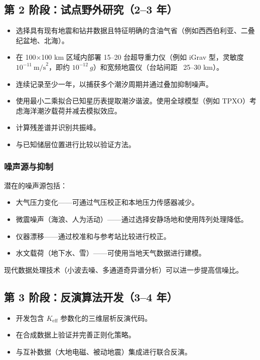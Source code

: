 \documentclass[12pt,a4paper]{article}
\theoremstyle{remark}
\newcommand{\Keff}{K_{\mathrm{eff}}}
\begin{document}
	\subsection{第 2 阶段：试点野外研究（2–3 年）}
	
	\begin{itemize}
		\item 选择具有现有地震和钻井数据且特征明确的含油气省（例如西西伯利亚、二叠纪盆地、北海）。
		\item 在 100×100 km 区域内部署 15–20 台超导重力仪（例如 iGrav 型，灵敏度 \(10^{-11}\ \text{m/s}^2\)，即约 \(10^{-12}\ g\)）和宽频地震仪（台站间距 ~25–30 km）。
		\item 连续记录至少一年，以捕获多个潮汐周期并通过叠加抑制噪声。
		\item 使用最小二乘拟合已知星历表提取潮汐谐波。使用全球模型（例如 TPXO）考虑海洋潮汐载荷并减去模拟效应。
		\item 计算残差谱并识别共振峰。
		\item 与已知储层位置进行比较以验证方法。
	\end{itemize}
	
	\subsubsection{噪声源与抑制}
	
	潜在的噪声源包括：
	\begin{itemize}
		\item 大气压力变化——可通过气压校正和本地压力传感器减少。
		\item 微震噪声（海浪、人为活动）——通过选择安静场地和使用阵列处理降低。
		\item 仪器漂移——通过校准和与参考站比较进行校正。
		\item 水文载荷（地下水、雪）——可使用当地天气数据进行建模。
	\end{itemize}
	
	现代数据处理技术（小波去噪、多通道奇异谱分析）可以进一步提高信噪比。
	
	\subsection{第 3 阶段：反演算法开发（3–4 年）}
	
	\begin{itemize}
		\item 开发包含 $\Keff$ 参数化的三维层析反演代码。
		\item 在合成数据上验证并完善正则化策略。
		\item 与互补数据（大地电磁、被动地震）集成进行联合反演。
	\end{itemize}
	
\end{document}
